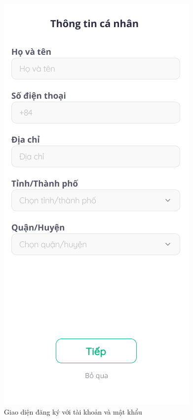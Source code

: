 \begin{figure}[!htb]
\begin{minipage}{0.32\textwidth}
     \caption{Giao diện đăng ký với tài khoản và mật khẩu}
   \end{minipage}\hfill
   \begin{minipage}{0.32\textwidth}
     \centering
     \includegraphics[width=1\linewidth]{Images/UI figma/Signup 2.png}

\end{minipage}
\end{figure}
